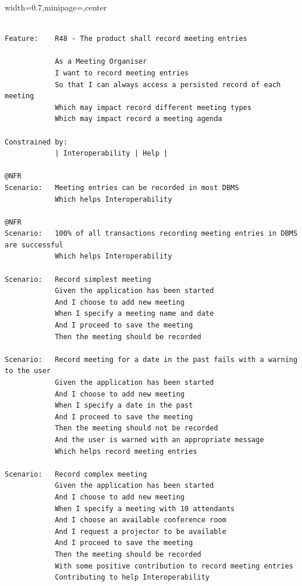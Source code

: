 \documentclass[dissertation,final]{softeng}
\newenvironment{featurecode}[1]
{ \lrbox\featurebox \begin{adjustbox}{width=#1\textwidth,minipage=\textwidth,center} }
{ \end{adjustbox}\endlrbox}
\newenvironment{featurelist}[2]
{
\newcommand{\setcaption}{\caption{#1}}
\newcommand{\setlabel}{\label{#2}}
}
{\begin{listing}[h!]\centering\usebox\featurebox\setcaption\setlabel\end{listing}}
\begin{document}
\begin{featurelist}{Changes to Gherkin -- Complete feature}{lst:gherkin_changes_complete}
\begin{featurecode}{0.7}
\begin{verbatim}

Feature:    R48 - The product shall record meeting entries

            As a Meeting Organiser
            I want to record meeting entries
            So that I can always access a persisted record of each meeting
            Which may impact record different meeting types
            Which may impact record a meeting agenda
	
Constrained by:
            | Interoperability | Help |

@NFR
Scenario:   Meeting entries can be recorded in most DBMS
            Which helps Interoperability

@NFR	
Scenario:   100% of all transactions recording meeting entries in DBMS are successful
            Which helps Interoperability
	
Scenario:   Record simplest meeting
            Given the application has been started
            And I choose to add new meeting
            When I specify a meeting name and date
            And I proceed to save the meeting
            Then the meeting should be recorded
	
Scenario:   Record meeting for a date in the past fails with a warning to the user
            Given the application has been started
            And I choose to add new meeting
            When I specify a date in the past
            And I proceed to save the meeting
            Then the meeting should not be recorded
            And the user is warned with an appropriate message
            Which helps record meeting entries

Scenario:   Record complex meeting
            Given the application has been started
            And I choose to add new meeting
            When I specify a meeting with 10 attendants
            And I choose an available conference room
            And I request a projector to be available
            And I proceed to save the meeting
            Then the meeting should be recorded
            With some positive contribution to record meeting entries
            Contributing to help Interoperability
\end{verbatim}
\end{featurecode}
\end{featurelist}
\end{document}
